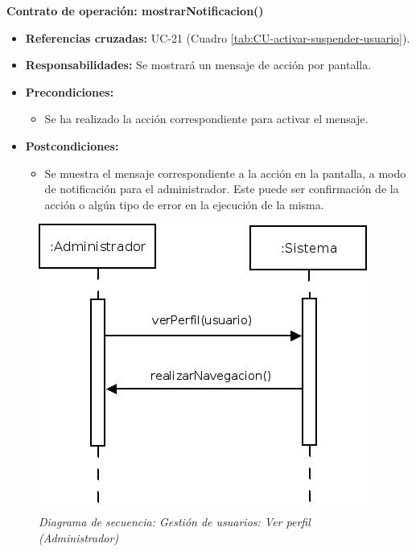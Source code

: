 \textbf{Contrato de operación: mostrarNotificacion()}
\begin{itemize}
\item \textbf{Referencias cruzadas:} UC-21 (Cuadro \ref{tab:CU-activar-suspender-usuario}).
\item \textbf{Responsabilidades:} Se mostrará un mensaje de acción por pantalla.
\item \textbf{Precondiciones:} 
 \begin{itemize}
\item Se ha realizado la acción correspondiente para activar el mensaje.
\end {itemize}
\item \textbf{Postcondiciones:} 
 \begin{itemize}
\item Se muestra el mensaje correspondiente a la acción en la pantalla, a modo de notificación para el administrador. Este puede ser confirmación de la acción o algún tipo de error en la ejecución de la misma.
\end {itemize}
\end {itemize}


\vspace{10mm}

\begin{figure}[H]
\centering
  \includegraphics[scale=.55]{img/secuencias/gestion-usuarios-ver-perfil.jpeg}
  \caption{\textit{Diagrama de secuencia: Gestión de usuarios: Ver perfil (Administrador)}}
  \label{fig:secuencia-gestion-usuarios-ver-perfil}
\end{figure}

